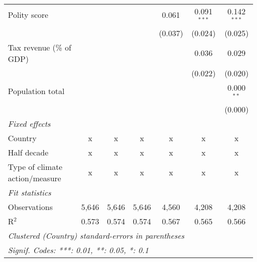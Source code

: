 \begin{tabular}{lcccccc}
   Polity score                                               &              &              &                & 0.061          & 0.091$^{***}$  & 0.142$^{***}$\\   
                                                              &              &              &                & (0.037)        & (0.024)        & (0.025)\\   
   Tax revenue (\% of GDP)                                    &              &              &                &                & 0.036          & 0.029\\   
                                                              &              &              &                &                & (0.022)        & (0.020)\\   
   Population total                                           &              &              &                &                &                & 0.000$^{**}$\\   
                                                              &              &              &                &                &                & (0.000)\\   
   \emph{Fixed effects}\\
   Country                                                    & x            & x            & x              & x              & x              & x\\  
   Half decade                                                & x            & x            & x              & x              & x              & x\\  
   Type of climate action/measure                             & x            & x            & x              & x              & x              & x\\  
   \midrule \emph{Fit statistics}\\
   Observations                                               & 5,646        & 5,646        & 5,646          & 4,560          & 4,208          & 4,208\\  
   R$^2$                                                      & 0.573        & 0.574        & 0.574          & 0.567          & 0.565          & 0.566\\  
   \midrule
   \multicolumn{7}{l}{\emph{Clustered (Country) standard-errors in parentheses}}\\
   \multicolumn{7}{l}{\emph{Signif. Codes: ***: 0.01, **: 0.05, *: 0.1}}\\
\end{tabular}
\par\endgroup


